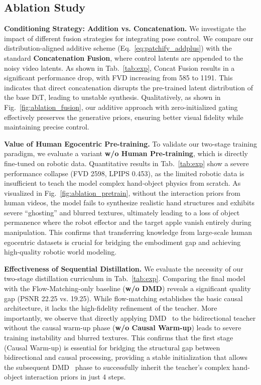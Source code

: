 \subsection{Ablation Study}

\noindent
\textbf{Conditioning Strategy: Addition vs. Concatenation.} 
We investigate the impact of different fusion strategies for integrating pose control. We compare our distribution-aligned additive scheme (Eq.~\ref{eq:patchify_addplus}) with the standard \textbf{Concatenation Fusion}, where control latents are appended to the noisy video latents. As shown in Tab.~\ref{tab:exp}, Concat Fusion results in a significant performance drop, with FVD increasing from 585 to 1191. This indicates that direct concatenation disrupts the pre-trained latent distribution of the base DiT, leading to unstable synthesis. Qualitatively, as shown in Fig.~\ref{fig:ablation_fusion}, our additive approach with zero-initialized gating effectively preserves the generative priors, ensuring better visual fidelity while maintaining precise control.

\noindent
\textbf{Value of Human Egocentric Pre-training.} 
To validate our two-stage training paradigm, we evaluate a variant \textbf{w/o Human Pre-training}, which is directly fine-tuned on robotic data. Quantitative results in Tab.~\ref{tab:exp} show a severe performance collapse (FVD 2598, LPIPS 0.453), as the limited robotic data is insufficient to teach the model complex hand-object physics from scratch. 
As visualized in Fig.~\ref{fig:ablation_pretrain}, without the interaction priors from human videos, the model fails to synthesize realistic hand structures and exhibits severe ``ghosting'' and blurred textures, ultimately leading to a loss of object permanence where the robot effector and the target apple vanish entirely during manipulation.
This confirms that transferring knowledge from large-scale human egocentric datasets is crucial for bridging the embodiment gap and achieving high-quality robotic world modeling.



\noindent
\textbf{Effectiveness of Sequential Distillation.}
We evaluate the necessity of our two-stage distillation curriculum in Tab.~\ref{tab:exp}. Comparing the final model with the Flow-Matching-only baseline (\textbf{w/o DMD}) reveals a significant quality gap (PSNR 22.25 vs. 19.25). While flow-matching establishes the basic causal architecture, it lacks the high-fidelity refinement of the teacher. More importantly, we observe that directly applying DMD~\citep{yin2024one} to the bidirectional teacher without the causal warm-up phase (\textbf{w/o Causal Warm-up}) leads to severe training instability and blurred textures. This confirms that the first stage (Causal Warm-up) is essential for bridging the structural gap between bidirectional and causal processing, providing a stable initialization that allows the subsequent DMD~\citep{yin2024one} phase to successfully inherit the teacher’s complex hand-object interaction priors in just 4 steps.






